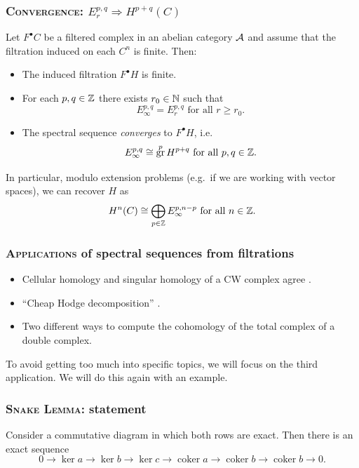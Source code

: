 \documentclass[notheorems]{beamer}
\theoremstyle{plain}
\theoremstyle{definition}
\theoremstyle{darkredexample}
\theoremstyle{remark}
\DeclareMathOperator{\gr}{gr}
\DeclareMathOperator{\coker}{coker}
\begin{document}
\begin{frame}
    \frametitle{\textsc{Convergence}: $E_{r}^{p,q}\Rightarrow H^{p+q}(C)$ \cite[Theorem 2.6]{mcc01}}
    Let $F^{\bullet}C$ be a filtered complex in an abelian category $\mathcal{A}$ and assume that the filtration induced on each $C^{n}$ is finite.
    Then:
    \pause
    \begin{itemize}
	\item The induced filtration $F^{\bullet}H$ is finite.
	    \pause
	\item For each $p,q\in \mathbb{Z}$ there exists $r_{0}\in \mathbb{N}$ such that
	    \[ E_{\infty}^{p,q}=E_{r}^{p,q} \text{ for all } r\geqslant r_{0}. \]
	    \pause
	\item The spectral sequence \textit{converges} to $F^{\bullet}H$, i.e.
	    \[ E_{\infty}^{p,q}\cong \gr^{p}H^{p+q} \text{ for all }p,q\in\Z. \]
	    \pause
    \end{itemize}
    In particular, modulo extension problems (e.g.~if we are working with vector spaces), we can recover $H$ as
    \[ H^{n}(C)\cong \bigoplus_{p\in \mathbb{Z}}E_{\infty}^{p,n-p}\text{ for all }n\in\mathbb{Z}. \]
\end{frame}

\begin{frame}
    \frametitle{\textsc{Applications} of spectral sequences from filtrations}
    \begin{itemize}
	\item Cellular homology and singular homology of a CW complex agree \cite[Theorem 4.13]{mcc01}.
	    \pause

	\item ``Cheap Hodge decomposition'' \cite[Remark 8.29]{voi02}.
	    \pause

	\item Two different ways to compute the cohomology of the total complex of a double complex.
    \end{itemize}
    \pause

    To avoid getting too much into specific topics, we will focus on the third application.
    We will do this again with an example.
\end{frame}

\begin{frame}
    \frametitle{\textsc{Snake Lemma}: statement}
    Consider a commutative diagram
    in which both rows are exact.
    \pause
    Then there is an exact sequence
    \[ 0\to \ker{a}\to \ker{b}\to \ker{c}\to \coker{a}\to \coker{b}\to \coker{b}\to 0. \]
\end{frame}
\end{document}
